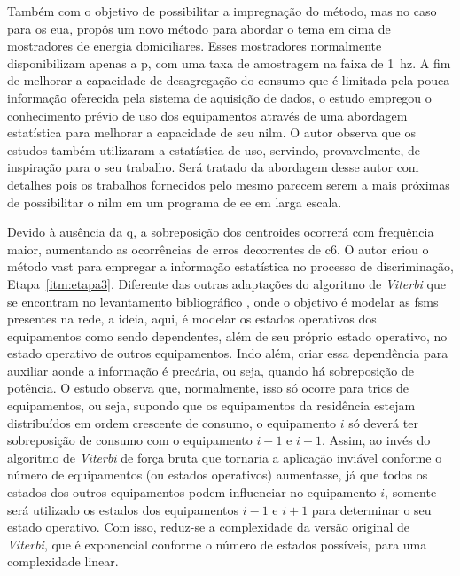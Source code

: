 \begin{enumerate}[label=\textbf{1.\arabic*},wide=\parindent]
Também com o objetivo de possibilitar a impregnação do método, mas no
caso para os \gls{eua},
\citeauthor*{nilm_zeifman_vastext_approach_2012} propôs um novo método
\cite{nilm_zeifman_vast_2011,
nilm_zeifman_vast_hisample_pdfmerge_2011,
nilm_zeifman_vastext_approach_2012,
nilm_zeifman_statistical_vastext_1stws_2012,
nilm_zeifman_statistical_naive_enduses_2013} para abordar o tema em
cima de mostradores de energia domiciliares. Esses mostradores
normalmente disponibilizam apenas a \acl{p}, com uma taxa de
amostragem na faixa de 1~\acs{hz}. A fim de melhorar a capacidade
de desagregação do consumo que é limitada pela pouca informação
oferecida pela sistema de aquisição de dados, o estudo empregou o
conhecimento prévio de uso dos equipamentos através de uma abordagem
estatística para melhorar a capacidade de seu \gls{nilm}. O autor
observa que os estudos \cite{nilm_farinaccio_16ssamp_1999_17,
nilm_marceau_16ssamp_improved_1999_18} também utilizaram a estatística
de uso, servindo, provavelmente, de inspiração para o seu trabalho.
Será tratado da abordagem desse autor com detalhes pois os trabalhos
fornecidos pelo mesmo parecem serem a mais próximas de possibilitar o
\gls{nilm} em um programa de \gls{ee} em larga escala.

Devido à ausência da \acl{q}, a sobreposição dos centroides ocorrerá
com frequência maior, aumentando as ocorrências de erros decorrentes
de \gls{c6}. O autor criou o método \gls{vast} para empregar a informação
estatística no processo de discriminação, Etapa~\ref{itm:etapa3}.
Diferente das outras adaptações do algoritmo de \emph{Viterbi} que se
encontram no levantamento bibliográfico
\cite{nilm_bouloutas_viterbi_ext_1991_11,
nilm_hart_fsm_viterbi_1993_12,nilm_baranski_genetic_base_2003_19,
nilm_baranski_genetic_detalhado_2004_20,nilm_baranski_summary_2004_21},
onde o objetivo é modelar as \glspl{fsm} presentes na rede, a ideia,
aqui, é modelar os estados operativos dos equipamentos como sendo
dependentes, além de seu próprio estado operativo, no estado operativo
de outros equipamentos. Indo além, criar essa dependência para
auxiliar aonde a informação é precária, ou seja, quando há
sobreposição de potência.  O estudo observa que, normalmente, isso só
ocorre para trios de equipamentos, ou seja, supondo que os equipamentos
da residência estejam distribuídos em ordem crescente de consumo, o
equipamento $i$ só deverá ter sobreposição de consumo com o equipamento
$i-1$ e $i+1$. Assim, ao invés do algoritmo de \emph{Viterbi} de força
bruta que tornaria a aplicação inviável conforme o número de equipamentos
(ou estados operativos) aumentasse, já que todos os estados dos outros
equipamentos podem influenciar no equipamento $i$, somente será utilizado os
estados dos equipamentos $i-1$ e $i+1$ para determinar o seu estado
operativo.  Com isso, reduz-se a complexidade da versão original de
\emph{Viterbi}, que é exponencial conforme o número de estados
possíveis, para uma complexidade linear.


\end{enumerate}
